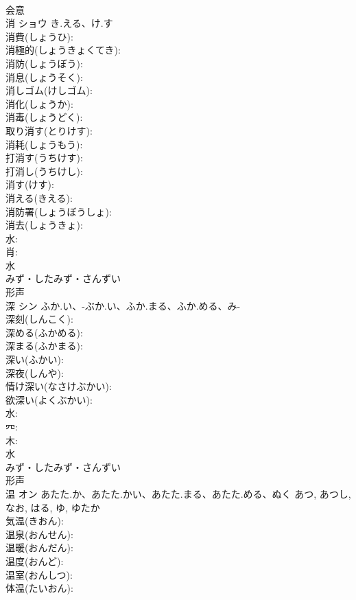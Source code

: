 \documentclass[8pt]{extreport}
\begin{document}
\begin{CJK}{UTF8}{min}
\\	会意 
\\	消	ショウ	き.える、け.す		
\\	消費(しょうひ): 
\\	消極的(しょうきょくてき): 
\\	消防(しょうぼう): 
\\	消息(しょうそく): 
\\	消しゴム(けしゴム): 
\\	消化(しょうか): 
\\	消毒(しょうどく): 
\\	取り消す(とりけす): 
\\	消耗(しょうもう): 
\\	打消す(うちけす): 
\\	打消し(うちけし): 
\\	消す(けす): 
\\	消える(きえる): 
\\	消防署(しょうぼうしょ): 
\\	消去(しょうきょ): 
\\	水: 
\\	肖: 
\\	水	
\\	みず・したみず・さんずい	
\\	形声 
\\	深	シン	ふか.い、-ぶか.い、ふか.まる、ふか.める、み-		
\\	深刻(しんこく): 
\\	深める(ふかめる): 
\\	深まる(ふかまる): 
\\	深い(ふかい): 
\\	深夜(しんや): 
\\	情け深い(なさけぶかい): 
\\	欲深い(よくぶかい): 
\\	水: 
\\	㓁: 
\\	木: 
\\	水	
\\	みず・したみず・さんずい	
\\	形声 
\\	温	オン	あたた.か、あたた.かい、あたた.まる、あたた.める、ぬく	あつ, あつし, なお, はる, ゆ, ゆたか	
\\	気温(きおん): 
\\	温泉(おんせん): 
\\	温暖(おんだん): 
\\	温度(おんど): 
\\	温室(おんしつ): 
\\	体温(たいおん): 

\end{CJK}
\end{document}
